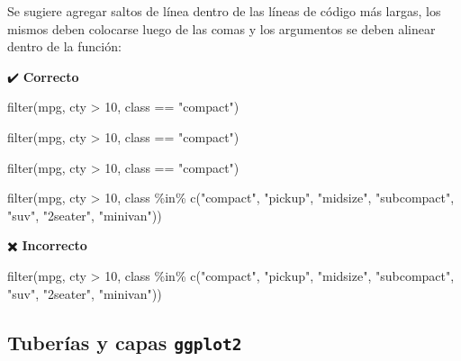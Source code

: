 \documentclass[
  spanish,
  a4paper,
]{scrbook}
\newenvironment{Shaded}{\begin{snugshade}}{\end{snugshade}}
\newcommand{\DecValTok}[1]{\textcolor[rgb]{0.68,0.00,0.00}{#1}}
\newcommand{\FunctionTok}[1]{\textcolor[rgb]{0.28,0.35,0.67}{#1}}
\newcommand{\NormalTok}[1]{\textcolor[rgb]{0.00,0.23,0.31}{#1}}
\newcommand{\SpecialCharTok}[1]{\textcolor[rgb]{0.37,0.37,0.37}{#1}}
\newcommand{\StringTok}[1]{\textcolor[rgb]{0.13,0.47,0.30}{#1}}
\begin{document}
Se sugiere agregar saltos de línea dentro de las líneas de código más
largas, los mismos deben colocarse luego de las comas y los argumentos
se deben alinear dentro de la función:

✔️ \textbf{Correcto}

\begin{Shaded}
\begin{Highlighting}[]
\FunctionTok{filter}\NormalTok{(mpg, cty }\SpecialCharTok{\textgreater{}} \DecValTok{10}\NormalTok{, class }\SpecialCharTok{==} \StringTok{"compact"}\NormalTok{)}


\FunctionTok{filter}\NormalTok{(mpg, cty }\SpecialCharTok{\textgreater{}} \DecValTok{10}\NormalTok{, }
\NormalTok{       class }\SpecialCharTok{==} \StringTok{"compact"}\NormalTok{)}


\FunctionTok{filter}\NormalTok{(mpg,}
\NormalTok{       cty }\SpecialCharTok{\textgreater{}} \DecValTok{10}\NormalTok{,}
\NormalTok{       class }\SpecialCharTok{==} \StringTok{"compact"}\NormalTok{)}

\FunctionTok{filter}\NormalTok{(mpg, }
\NormalTok{       cty }\SpecialCharTok{\textgreater{}} \DecValTok{10}\NormalTok{, }
\NormalTok{       class }\SpecialCharTok{\%in\%} \FunctionTok{c}\NormalTok{(}\StringTok{"compact"}\NormalTok{, }\StringTok{"pickup"}\NormalTok{, }\StringTok{"midsize"}\NormalTok{, }\StringTok{"subcompact"}\NormalTok{, }
                    \StringTok{"suv"}\NormalTok{, }\StringTok{"2seater"}\NormalTok{, }\StringTok{"minivan"}\NormalTok{))}
\end{Highlighting}
\end{Shaded}

✖️ \textbf{Incorrecto}

\begin{Shaded}
\begin{Highlighting}[]
\FunctionTok{filter}\NormalTok{(mpg, cty }\SpecialCharTok{\textgreater{}} \DecValTok{10}\NormalTok{, class }\SpecialCharTok{\%in\%} \FunctionTok{c}\NormalTok{(}\StringTok{"compact"}\NormalTok{, }\StringTok{"pickup"}\NormalTok{, }\StringTok{"midsize"}\NormalTok{, }\StringTok{"subcompact"}\NormalTok{, }\StringTok{"suv"}\NormalTok{, }\StringTok{"2seater"}\NormalTok{, }\StringTok{"minivan"}\NormalTok{))}
\end{Highlighting}
\end{Shaded}

\subsection{\texorpdfstring{Tuberías y capas
\texttt{ggplot2}}{Tuberías y capas ggplot2}}\label{tuberuxedas-y-capas-ggplot2}
\end{document}
